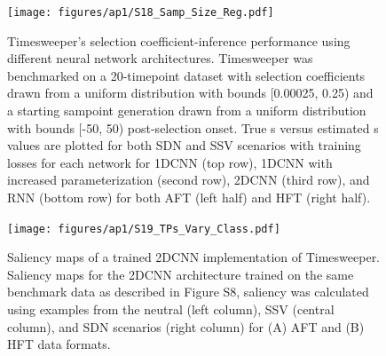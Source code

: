 \begin{figure}
    \centering
    \texttt{[image: figures/ap1/S18\_Samp\_Size\_Reg.pdf]}
    \caption[Timesweeper’s selection coefficient-inference performance using different neural network architectures.]{Timesweeper’s selection coefficient-inference performance using different neural network architectures. Timesweeper was benchmarked on a 20-timepoint dataset with selection coefficients drawn from a uniform distribution with bounds [0.00025, 0.25) and a starting sampoint generation drawn from a uniform distribution with bounds [-50, 50) post-selection onset. True s versus estimated s values are plotted for both SDN and SSV scenarios with training losses for each network for 1DCNN (top row), 1DCNN with increased parameterization (second row), 2DCNN (third row), and RNN (bottom row) for both AFT (left half) and HFT (right half).}
    \label{fig:S18_Samp_Size_Reg}
\end{figure}

\begin{figure}
    \centering
    \texttt{[image: figures/ap1/S19\_TPs\_Vary\_Class.pdf]}
    \caption[Saliency maps of a trained 2DCNN implementation of Timesweeper.]{Saliency maps of a trained 2DCNN implementation of Timesweeper. Saliency maps for the 2DCNN architecture trained on the same benchmark data as described in Figure S8, saliency was calculated using examples from the neutral (left column), SSV (central column), and SDN scenarios (right column) for (A) AFT and (B) HFT data formats.}
    \label{fig:S19_TPs_Vary_Class}
\end{figure}

